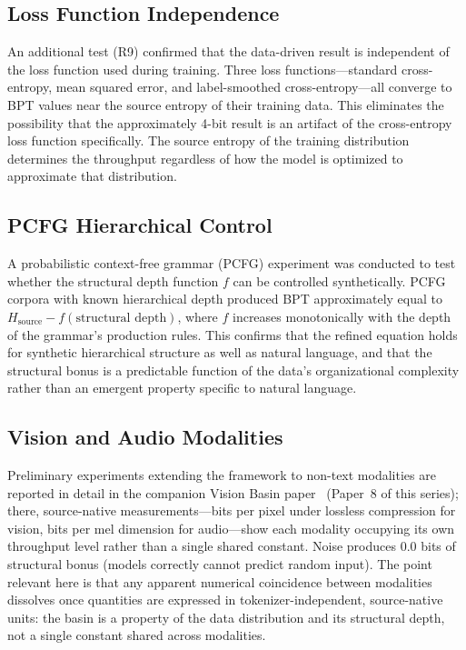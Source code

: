 \documentclass[11pt]{article}
\begin{document}
\subsection{Loss Function Independence}

An additional test (R9) confirmed that the data-driven result is independent of the loss function used during training. Three loss functions---standard cross-entropy, mean squared error, and label-smoothed cross-entropy---all converge to BPT values near the source entropy of their training data. This eliminates the possibility that the approximately 4-bit result is an artifact of the cross-entropy loss function specifically. The source entropy of the training distribution determines the throughput regardless of how the model is optimized to approximate that distribution.

\subsection{PCFG Hierarchical Control}

A probabilistic context-free grammar (PCFG) experiment was conducted to test whether the structural depth function $f$ can be controlled synthetically. PCFG corpora with known hierarchical depth produced BPT approximately equal to $H_{\mathrm{source}} - f(\text{structural depth})$, where $f$ increases monotonically with the depth of the grammar's production rules. This confirms that the refined equation holds for synthetic hierarchical structure as well as natural language, and that the structural bonus is a predictable function of the data's organizational complexity rather than an emergent property specific to natural language.

\subsection{Vision and Audio Modalities}

Preliminary experiments extending the framework to non-text modalities are reported in detail in the companion Vision Basin paper~\cite{whitmer2026vision} (Paper~8 of this series); there, source-native measurements---bits per pixel under lossless compression for vision, bits per mel dimension for audio---show each modality occupying its own throughput level rather than a single shared constant. Noise produces 0.0 bits of structural bonus (models correctly cannot predict random input). The point relevant here is that any apparent numerical coincidence between modalities dissolves once quantities are expressed in tokenizer-independent, source-native units: the basin is a property of the data distribution and its structural depth, not a single constant shared across modalities.
\end{document}
